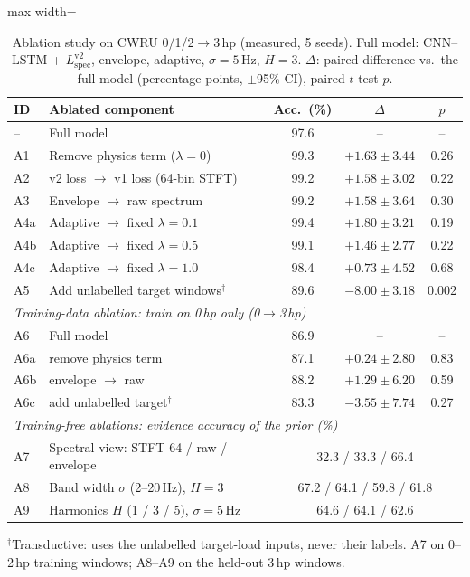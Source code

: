 \documentclass[conference]{IEEEtran}
\newcommand{\Lspec}{L_{\mathrm{spec}}}
\begin{document}
\begin{table}[t]
\caption{Ablation study on CWRU 0/1/2$\to$3\,hp (measured, 5 seeds). Full
model: CNN--LSTM + $\Lspec^{\mathrm{v2}}$, envelope, adaptive, $\sigma=5$\,Hz,
$H=3$. $\Delta$: paired difference vs.\ the full model (percentage points,
$\pm$95\% CI), paired $t$-test $p$.}
\label{tab:ablation}
\centering
\footnotesize
\begin{adjustbox}{max width=\columnwidth}
\begin{tabular}{llccc}
\toprule
ID & Ablated component & Acc.\ (\%) & $\Delta$ & $p$ \\
\midrule
-- & Full model & 97.6 & -- & -- \\
\midrule
A1 & Remove physics term ($\lambda=0$) & 99.3 & $+1.63\pm3.44$ & 0.26 \\
A2 & v2 loss $\to$ v1 loss (64-bin STFT) & 99.2 & $+1.58\pm3.02$ & 0.22 \\
A3 & Envelope $\to$ raw spectrum & 99.2 & $+1.58\pm3.64$ & 0.30 \\
A4a & Adaptive $\to$ fixed $\lambda=0.1$ & 99.4 & $+1.80\pm3.21$ & 0.19 \\
A4b & Adaptive $\to$ fixed $\lambda=0.5$ & 99.1 & $+1.46\pm2.77$ & 0.22 \\
A4c & Adaptive $\to$ fixed $\lambda=1.0$ & 98.4 & $+0.73\pm4.52$ & 0.68 \\
A5 & Add unlabelled target windows$^{\dagger}$ & 89.6 & $-8.00\pm3.18$ & 0.002 \\
\midrule
\multicolumn{5}{l}{\emph{Training-data ablation: train on 0\,hp only (0$\to$3\,hp)}} \\
A6 & Full model & 86.9 & -- & -- \\
A6a & \quad remove physics term & 87.1 & $+0.24\pm2.80$ & 0.83 \\
A6b & \quad envelope $\to$ raw & 88.2 & $+1.29\pm6.20$ & 0.59 \\
A6c & \quad add unlabelled target$^{\dagger}$ & 83.3 & $-3.55\pm7.74$ & 0.27 \\
\midrule
\multicolumn{5}{l}{\emph{Training-free ablations: evidence accuracy of the prior (\%)}} \\
A7 & Spectral view: STFT-64 / raw / envelope & \multicolumn{3}{c}{32.3 / 33.3 / 66.4} \\
A8 & Band width $\sigma$ (2--20\,Hz), $H=3$ & \multicolumn{3}{c}{67.2 / 64.1 / 59.8 / 61.8} \\
A9 & Harmonics $H$ (1 / 3 / 5), $\sigma=5$\,Hz & \multicolumn{3}{c}{64.6 / 64.1 / 62.6} \\
\bottomrule
\end{tabular}
\end{adjustbox}
\par\vspace{2pt}\parbox{\columnwidth}{\scriptsize $^{\dagger}$Transductive: uses
the unlabelled target-load inputs, never their labels. A7 on 0--2\,hp training
windows; A8--A9 on the held-out 3\,hp windows.}
\end{table}
\end{document}
